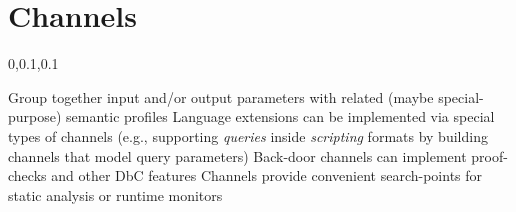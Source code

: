 
\section{Channels}\fbeg{}\begin{frame}{}

\vspace{-.5em}	

{\Large{}\selectfont

\hspace*{20pt}\begin{minipage}{\textwidth}
\vspace{4pt}
		
\begin{lightquadblockc}{0,0.1,0.1}{\parbox{21cm}{\centering \vspace{3pt}}}
\begin{center}\begin{minipage}{1.05\textwidth}
{\Huge \setlength{\leftmargini}{30pt}\begin{enumerate}
\dmitem {\dsp} Group together input and/or output parameters with related (maybe special-purpose) semantic profiles 
\vspace{20pt}
\dmitem {\dsp} Language extensions can be implemented via special types of channels 
(e.g., supporting \textsl{queries} inside \textsl{scripting} formats by 
building channels that model query parameters) 
\vspace{20pt}
\dmitem {\dsp} Back-door channels can implement proof-checks and other DbC features
\vspace{20pt}
\dmitem {\dsp} Channels provide convenient search-points for static analysis 
or runtime monitors
\vspace{20pt}
\end{enumerate}
}\end{minipage}
\end{center}
\end{lightquadblockc}
\end{minipage}

}

\end{frame}

